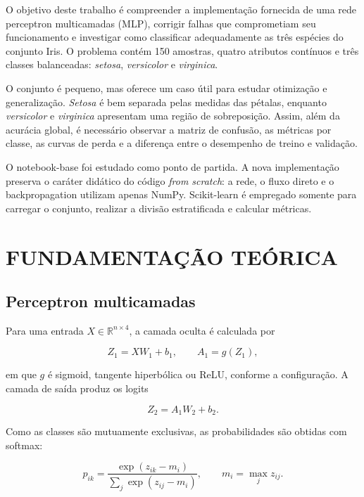 \documentclass[12pt,a4paper,oneside,openany,chapter=TITLE,section=TITLE,subsection=TITLE,brazil]{abntex2}
\begin{document}
O objetivo deste trabalho é compreender a implementação fornecida de uma rede perceptron multicamadas (MLP), corrigir falhas que comprometiam seu funcionamento e investigar como classificar adequadamente as três espécies do conjunto Iris. O problema contém 150 amostras, quatro atributos contínuos e três classes balanceadas: \textit{setosa}, \textit{versicolor} e \textit{virginica}.

O conjunto é pequeno, mas oferece um caso útil para estudar otimização e generalização. \textit{Setosa} é bem separada pelas medidas das pétalas, enquanto \textit{versicolor} e \textit{virginica} apresentam uma região de sobreposição. Assim, além da acurácia global, é necessário observar a matriz de confusão, as métricas por classe, as curvas de perda e a diferença entre o desempenho de treino e validação.

O notebook-base foi estudado como ponto de partida. A nova implementação preserva o caráter didático do código \textit{from scratch}: a rede, o fluxo direto e o backpropagation utilizam apenas NumPy. Scikit-learn é empregado somente para carregar o conjunto, realizar a divisão estratificada e calcular métricas.

\chapter{FUNDAMENTAÇÃO TEÓRICA}

\section{Perceptron multicamadas}

Para uma entrada $X \in \mathbb{R}^{n \times 4}$, a camada oculta é calculada por

\begin{equation}
  Z_1 = XW_1 + b_1,
  \qquad
  A_1 = g(Z_1),
\end{equation}

em que $g$ é sigmoid, tangente hiperbólica ou ReLU, conforme a configuração. A camada de saída produz os logits

\begin{equation}
  Z_2 = A_1W_2 + b_2.
\end{equation}

Como as classes são mutuamente exclusivas, as probabilidades são obtidas com softmax:

\begin{equation}
  p_{ik} = \frac{\exp(z_{ik}-m_i)}{\sum_j \exp(z_{ij}-m_i)},
  \qquad m_i = \max_j z_{ij}.
\end{equation}
\end{document}
